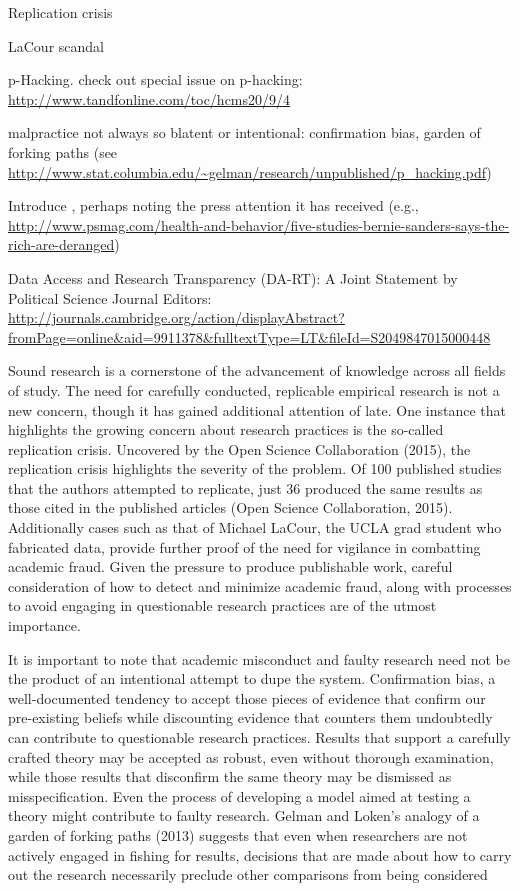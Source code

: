 
Replication crisis

LaCour scandal

p-Hacking.  check out special issue on p-hacking: \url{http://www.tandfonline.com/toc/hcms20/9/4}

malpractice not always so blatent or intentional: confirmation bias, garden of forking paths (see \url{http://www.stat.columbia.edu/~gelman/research/unpublished/p_hacking.pdf})

Introduce \citet{Newman2015}, perhaps noting the press attention it has received (e.g., \url{http://www.psmag.com/health-and-behavior/five-studies-bernie-sanders-says-the-rich-are-deranged})

Data Access and Research Transparency (DA-RT): A Joint Statement by Political Science Journal Editors: \url{http://journals.cambridge.org/action/displayAbstract?fromPage=online&aid=9911378&fulltextType=LT&fileId=S2049847015000448}

Sound research is a cornerstone of the advancement of knowledge across all fields of study. The need for carefully conducted, replicable empirical research is not a new concern, though it has gained additional attention of late. One instance that highlights the growing concern about research practices is the so-called replication crisis. Uncovered by the Open Science Collaboration (2015), the replication crisis highlights the severity of the problem. Of 100 published studies that the authors attempted to replicate, just 36 produced the same results as those cited in the published articles (Open Science Collaboration, 2015). Additionally cases such as that of Michael LaCour, the UCLA grad student who fabricated data, provide further proof of the need for vigilance in combatting academic fraud. Given the pressure to produce publishable work, careful consideration of how to detect and minimize academic fraud, along with processes to avoid engaging in questionable research practices are of the utmost importance.

It is important to note that academic misconduct and faulty research need not be the product of an intentional attempt to dupe the system. Confirmation bias, a well-documented tendency to accept those pieces of evidence that confirm our pre-existing beliefs while discounting evidence that counters them undoubtedly can contribute to questionable research practices. Results that support a carefully crafted theory may be accepted as robust, even without thorough examination, while those results that disconfirm the same theory may be dismissed as misspecification. Even the process of developing a model aimed at testing a theory might contribute to faulty research. Gelman and Loken’s analogy of a garden of forking paths (2013) suggests that even when researchers are not actively engaged in fishing for results, decisions that are made about how to carry out the research necessarily preclude other comparisons from being considered

